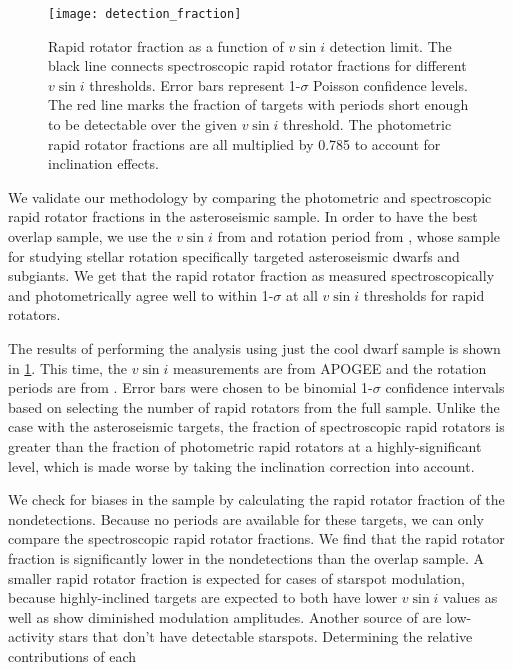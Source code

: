 \documentclass[manuscript]{aastex6}
\newcommand{\vsini}{\ensuremath{v \sin i}}
\begin{document}
\begin{figure}[htb]
    \centering
    \texttt{[image: detection\_fraction]}
    \caption{Rapid rotator fraction as a function of \vsini{} detection limit.
    The black line connects spectroscopic rapid rotator fractions for different
    \vsini{} thresholds. Error bars represent 1-\(\sigma\) Poisson confidence
    levels. The red line marks the fraction of targets with \citet{McQuillan14} 
periods short enough to be detectable over the given \vsini{} threshold. The
photometric rapid rotator fractions are all multiplied by 0.785 to account for
inclination effects.\label{fig:detection_fraction}}
\end{figure}

We validate our methodology by comparing the photometric and spectroscopic
rapid rotator fractions in the asteroseismic sample. In order to have the best
overlap sample, we use the \vsini{} from \citet{Bruntt12} and rotation period 
from \citet{Garcia14}, whose sample for studying stellar rotation specifically
targeted asteroseismic dwarfs and subgiants. We get that the rapid rotator
fraction as measured spectroscopically and photometrically agree well to within
1-\(\sigma\) at all \vsini{} thresholds for rapid rotators.

The results of performing the analysis using just the cool dwarf sample is
shown in \cref{fig:detection_fraction}. This time, the \vsini{} measurements
are from APOGEE and the rotation periods are from \citet{McQuillan14}. Error
bars were chosen to be binomial 1-\(\sigma\) confidence intervals based on
selecting the number of rapid rotators from the full sample. Unlike  
the case with the asteroseismic targets, the fraction of spectroscopic rapid
rotators is greater than the fraction of photometric rapid
rotators at a highly-significant level, which is made worse by taking the
inclination correction into account.

We check for biases in the \citet{McQuillan14} sample by calculating the rapid 
rotator fraction of the \citet{McQuillan14} nondetections. Because no periods
are available for these targets, we can only compare the spectroscopic rapid
rotator fractions. We find that the rapid rotator fraction is significantly
lower in the nondetections than the overlap sample. A smaller rapid rotator
fraction is expected for cases of starspot modulation, because highly-inclined
targets are expected to both have lower \vsini{} values as well as show
diminished modulation amplitudes. Another source of \citet{McQuillan14} are
low-activity stars that don't have detectable starspots. Determining the
relative contributions of each 
\end{document}
